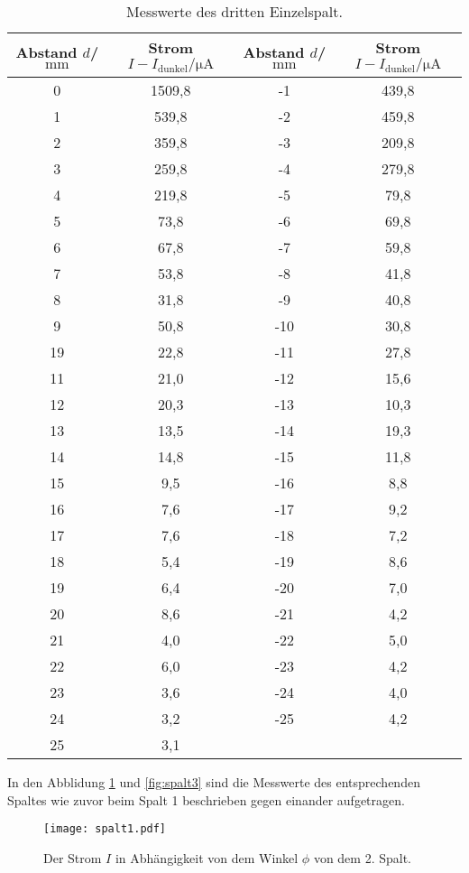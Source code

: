 \begin{table}
  \centering
  \caption{Messwerte des dritten Einzelspalt.}
  \label{tab:spalt3}
  \begin{tabular}{c c c c}
Abstand $d$/$\si{\milli\meter}$ & Strom $I-I_\mathrm{dunkel}/\si{\micro\ampere}$&Abstand $d$/$\si{\milli\meter}$ & Strom $I-I_\mathrm{dunkel}/\si{\micro\ampere}$\\
  \midrule
  0  & 1509,8 & -1 & 439,8\\
  1  & 539,8  & -2 & 459,8\\
  2  & 359,8  & -3 & 209,8\\
  3  & 259,8  & -4 & 279,8\\
  4  & 219,8  & -5 &  79,8\\
  5  & 73,8   & -6 &  69,8\\
  6  & 67,8   & -7 &  59,8\\
  7  & 53,8   & -8 &  41,8\\
  8  & 31,8   & -9 &  40,8\\
  9  & 50,8   & -10 & 30,8\\
  19 & 22,8   & -11 & 27,8\\
  11 & 21,0   & -12 & 15,6\\
  12 & 20,3   & -13 & 10,3\\
  13 & 13,5   & -14 & 19,3\\
  14 & 14,8   & -15 & 11,8\\
  15 & 9,5    & -16 &  8,8\\
  16 & 7,6    & -17 &  9,2\\
  17 & 7,6    & -18 &  7,2\\
  18 & 5,4    & -19 &  8,6\\
  19 & 6,4    & -20 &  7,0\\
  20 & 8,6    & -21 &  4,2\\
  21 & 4,0    & -22 &  5,0\\
  22 & 6,0    & -23 &  4,2\\
  23 & 3,6    & -24 &  4,0\\
  24 & 3,2    & -25 &  4,2\\
  25 & 3,1    &     &     \\
  \bottomrule
  \end{tabular}
\end{table}
\FloatBarrier

In den Abblidung \ref{fig:spalt2} und \ref{fig:spalt3} sind
die Messwerte des entsprechenden Spaltes wie zuvor beim Spalt 1 beschrieben
gegen einander aufgetragen.


\begin{figure}
  \centering
  \texttt{[image: spalt1.pdf]}
  \caption{ Der Strom $I$ in Abhängigkeit von dem Winkel $\phi$ von dem 2. Spalt.}
 \label{fig:spalt2}
\end{figure}
\FloatBarrier

